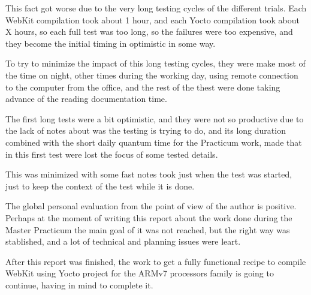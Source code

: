 \documentclass[a4paper,11pt,openany]{report}
\begin{document}
This fact got worse due to the very long testing cycles of the different trials. Each WebKit compilation took about 1 hour, and each Yocto compilation took about X hours, so each full test was too long, so the failures were too expensive, and they become the initial timing in optimistic in some way.

To try to minimize the impact of this long testing cycles, they were make most of the time on night, other times during the working day, using remote connection to the computer from the office, and the rest of the thest were done taking advance of the reading documentation time.

The first long tests were a bit optimistic, and they were not so productive due to the lack of notes about was the testing is trying to do, and its long duration combined with the short daily quantum time for the Practicum work, made that in this first test were lost the focus of some tested details.

This was minimized with some fast notes took just when the test was started, just to keep the context of the test while it is done.

The global personal evaluation from the point of view of the author is positive. Perhaps at the moment of writing this report about the work done during the Master Practicum the main goal of it was not reached, but the right way was stablished, and a lot of technical and planning issues were leart.

After this report was finished, the work to get a fully functional recipe to compile WebKit using Yocto project for the ARMv7 processors family is going to continue, having in mind to complete it.
\end{document}
